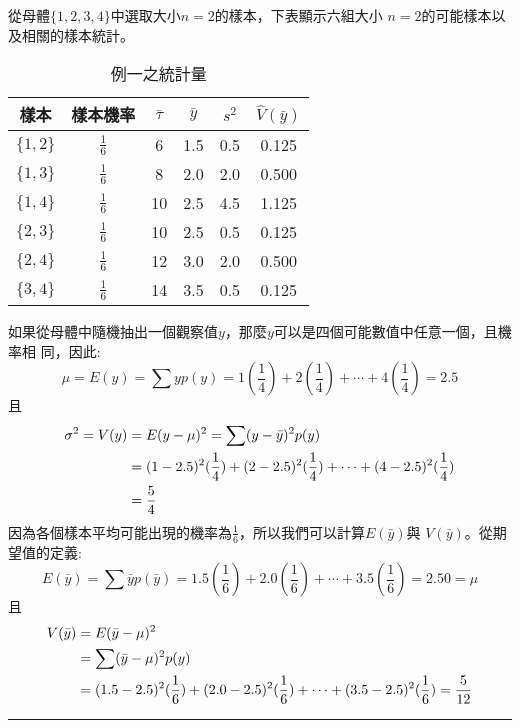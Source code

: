 			\begin{ex}\label{ex:SRS}
				從母體$\{1,2,3,4\}$中選取大小$n=2$的樣本，下表顯示六組大小									$n=2$的可能樣本以及相關的樣本統計。				
				\begin{table}[h]\label{table_srs}
					\centering
					\caption{例一之統計量}
					\begin{tabular}{cccccc}
					\hline
					樣本 & 樣本機率 & $\bar{\tau}$ & $\bar{y}$ & $s^2$ & $\hat{V}({\bar{y}})$\\ \hline
					$\{1,2\}$ & $\frac{1}{6}$ & 6 & 1.5 & 0.5 & 0.125 \\ \hline
					$\{1,3\}$ & $\frac{1}{6}$ & 8 & 2.0 & 2.0 & 0.500 \\ \hline
					$\{1,4\}$ & $\frac{1}{6}$ & 10 & 2.5 & 4.5 & 1.125 \\ \hline
					$\{2,3\}$ & $\frac{1}{6}$ & 10 & 2.5 & 0.5 & 0.125 \\ \hline
					$\{2,4\}$ & $\frac{1}{6}$ & 12 & 3.0 & 2.0 & 0.500 \\ \hline
					$\{3,4\}$ & $\frac{1}{6}$ & 14 & 3.5 & 0.5 & 0.125 \\ \hline
					\end{tabular}
				\end{table}
				
				如果從母體中隨機抽出一個觀察值$y$，那麼$y$可以是四個可能數值中任意一個，且機率相					同，因此:
				$$\mu = E(y) = \sum y p(y) = 1(\frac{1}{4})+2(\frac{1}{4})+\cdots 						+4(\frac{1}{4}) = 2.5$$
				且\begin{equation}\notag
				\begin{aligned} 					
				 \sigma^2 = V(y) &= E(y-\mu)^2 = \sum(y-\bar{y})^2 p(y)\\ &= 
				(1-2.5)^2(\frac{1}{4})+(2-2.5)^2(\frac{1}{4})+\cdots									+(4-2.5)^2(\frac{1}{4})\\&=\frac{5}{4}
				\end{aligned}
				\end{equation}
				因為各個樣本平均可能出現的機率為$\frac{1}{6}$，所以我們可以計算$E(\bar{y})$與					$ V(\bar{y}) $。從期望值的定義:
				$$ E(\bar{y})=\sum \bar{y} p(\bar{y})=1.5(\frac{1}{6})+2.0(\frac{1}						{6})+\cdots+3.5(\frac{1}{6})=2.50=\mu$$
				且\begin{equation}\notag
				\begin{aligned} 
				 V(\bar{y})&=E(\bar{y}-\mu)^2 \\ &= \sum(\bar{y}-\mu)^2 p(y)\\ 							&=(1.5-2.5)^2(\frac{1}{6})+(2.0-2.5)^2(\frac{1}{6})+\cdots+(3.5-2.5)^2 				(\frac{1}{6})=\frac{5}{12}
				\end{aligned}
				\end{equation}
				
			\end{ex}
			\rule{\textwidth}{0.2pt}			
